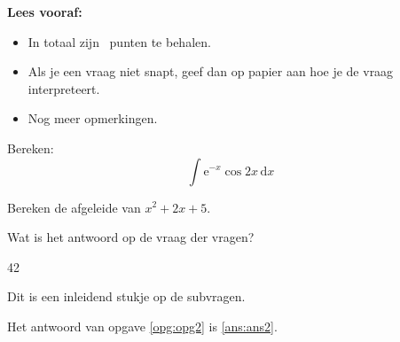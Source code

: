 \documentclass[12pt,dutch,addpoints]{tisdexam}
\begin{document}
\makecoverpage


\textbf{Lees vooraf:}
\begin{itemize}
\item In totaal zijn \numpoints\ punten te behalen.
\item Als je een vraag niet snapt, geef dan op papier aan hoe je de vraag interpreteert.
\item Nog meer opmerkingen.
\end{itemize}

\hrulefill

\begin{questions}


\question[5]
Bereken: \[\int \mathrm{e}^{-x}\cos 2x \, \mathrm{d}x\]

\question[5]
Bereken de afgeleide van $x^2+2x+5$.

\question[2]
\label{opg:opg2}
Wat is het antwoord op de vraag der vragen?
\begin{choices}
\CorrectChoice \label{ans:ans2} 42
\end{choices}

\question
Dit is een inleidend stukje op de subvragen.

\end{questions}

\hrulefill

Het antwoord van opgave \ref{opg:opg2} is \ref{ans:ans2}.
\end{document}
